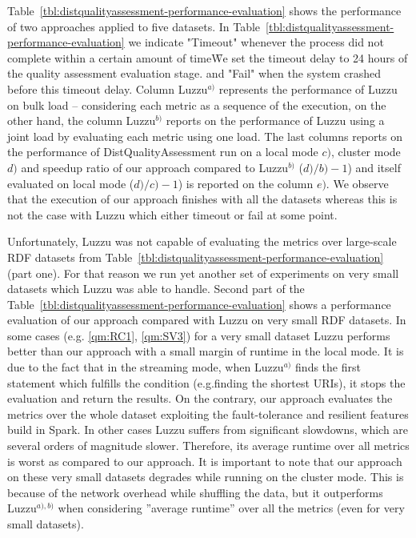 Table~\ref{tbl:distqualityassessment-performance-evaluation} shows the performance of two approaches applied to five datasets.
In Table~\ref{tbl:distqualityassessment-performance-evaluation} we indicate "Timeout" whenever the process did not complete within a certain amount of time\f{We set the timeout delay to 24 hours of the quality assessment evaluation stage.} and "Fail" when the system crashed before this timeout delay.
Column Luzzu$^{a)}$ represents the performance of Luzzu on bulk load -- considering each metric as a sequence of the execution, on the other hand, the column Luzzu$^{b)}$ reports on the performance of Luzzu using a joint load by evaluating each metric using one load.
The last columns reports on the performance of DistQualityAssessment run on a local mode $c)$, cluster mode $d)$ and speedup ratio of our approach compared to Luzzu$^{b)}$ ($d)/b)-1$) and itself evaluated on local mode ($d)/c)-1$) is reported on the column $e)$.
We observe that the execution of our approach finishes with all the datasets whereas this is not the case with Luzzu which either timeout or fail at some point.

Unfortunately, Luzzu was not capable of evaluating the metrics over large-scale RDF datasets from Table~\ref{tbl:distqualityassessment-performance-evaluation} (part one). 
For that reason we run yet another set of experiments on very small datasets which Luzzu was able to handle. 
Second part of the Table~\ref{tbl:distqualityassessment-performance-evaluation} shows a performance evaluation of our approach compared with Luzzu on very small RDF datasets.
In some cases (e.g. \ref{qm:RC1}, \ref{qm:SV3}) for a very small dataset Luzzu performs better than our approach with a small margin of runtime in the local mode.
It is due to the fact that in the streaming mode, when Luzzu$^{a)}$ finds the first statement which fulfills the condition (e.g.finding the shortest URIs), it stops the evaluation and return the results.
On the contrary, our approach evaluates the metrics over the whole dataset exploiting the fault-tolerance and resilient features build in Spark.
In other cases Luzzu suffers from significant slowdowns, which are several orders of magnitude slower.
Therefore, its average runtime over all metrics is worst as compared to our approach. 
It is important to note that our approach on these very small datasets degrades while running on the cluster mode.
This is because of the network overhead while shuffling the data, but it outperforms Luzzu$^{a),b)}$ when considering ''average runtime'' over all the metrics (even for very small datasets).

